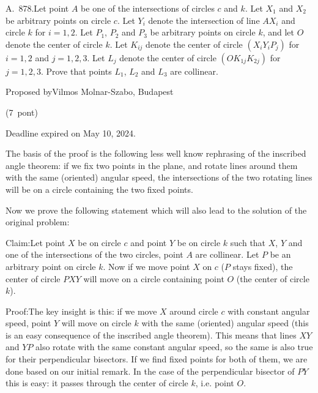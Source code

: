 \documentclass{article}
\begin{document}
A. 878.Let point \(\displaystyle A\) be one of the intersections of circles \(\displaystyle c\) and \(\displaystyle k\). Let \(\displaystyle X_1\) and \(\displaystyle X_2\) be arbitrary points on circle \(\displaystyle c\). Let \(\displaystyle Y_i\) denote the intersection of line \(\displaystyle AX_i\) and circle \(\displaystyle k\) for \(\displaystyle i=1,2\). Let \(\displaystyle P_1\), \(\displaystyle P_2\) and \(\displaystyle P_3\) be arbitrary points on circle \(\displaystyle k\), and let \(\displaystyle O\) denote the center of circle \(\displaystyle k\). Let \(\displaystyle K_{ij}\) denote the center of circle \(\displaystyle (X_iY_iP_j)\) for \(\displaystyle i=1,2\) and \(\displaystyle j=1,2,3\). Let \(\displaystyle L_j\) denote the center of circle \(\displaystyle (OK_{1j}K_{2j})\) for \(\displaystyle j=1,2,3\). Prove that points \(\displaystyle L_1\), \(\displaystyle L_2\) and \(\displaystyle L_3\) are collinear.

Proposed byVilmos Molnar-Szabo, Budapest

(7 pont)

Deadline expired on May 10, 2024.

The basis of the proof is the following less well know rephrasing of the inscribed angle theorem: if we fix two points in the plane, and rotate lines around them with the same (oriented) angular speed, the intersections of the two rotating lines will be on a circle containing the two fixed points.

Now we prove the following statement which will also lead to the solution of the original problem:

Claim:Let point \(\displaystyle X\) be on circle \(\displaystyle c\) and point \(\displaystyle Y\) be on circle \(\displaystyle k\) such that \(\displaystyle X\), \(\displaystyle Y\) and one of the intersections of the two circles, point \(\displaystyle A\) are collinear. Let \(\displaystyle P\) be an arbitrary point on circle \(\displaystyle k\). Now if we move point \(\displaystyle X\) on \(\displaystyle c\) (\(\displaystyle P\) stays fixed), the center of circle \(\displaystyle PXY\) will move on a circle containing point \(\displaystyle O\) (the center of circle \(\displaystyle k\)).

Proof:The key insight is this: if we move \(\displaystyle X\) around circle \(\displaystyle c\) with constant angular speed, point \(\displaystyle Y\) will move on circle \(\displaystyle k\) with the same (oriented) angular speed (this is an easy consequence of the inscribed angle theorem). This means that lines \(\displaystyle XY\) and \(\displaystyle YP\) also rotate with the same constant angular speed, so the same is also true for their perpendicular bisectors. If we find fixed points for both of them, we are done based on our initial remark. In the case of the perpendicular bisector of \(\displaystyle PY\) this is easy: it passes through the center of circle \(\displaystyle k\), i.e. point \(\displaystyle O\).
\end{document}
